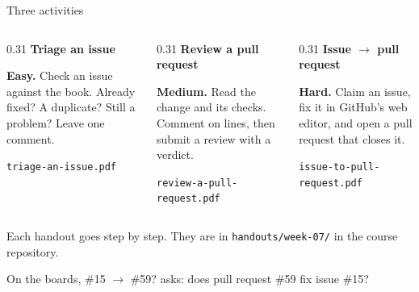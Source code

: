 \documentclass[9pt,aspectratio=169]{beamer}
\begin{document}
\begin{frame}{Three activities}
    \begin{columns}[T]
        \begin{column}{0.31\textwidth}
            \textbf{Triage an issue}\\[2pt]
            {\small \textbf{Easy.} Check an issue against the book. Already fixed? A duplicate? Still a problem? Leave one comment.\par}
            \medskip
            {\footnotesize \texttt{triage-an-issue.pdf}\par}
        \end{column}
        \begin{column}{0.31\textwidth}
            \textbf{Review a pull request}\\[2pt]
            {\small \textbf{Medium.} Read the change and its checks. Comment on lines, then submit a review with a verdict.\par}
            \medskip
            {\footnotesize \texttt{review-a-pull-request.pdf}\par}
        \end{column}
        \begin{column}{0.31\textwidth}
            \textbf{Issue $\to$ pull request}\\[2pt]
            {\small \textbf{Hard.} Claim an issue, fix it in GitHub's web editor, and open a pull request that closes it.\par}
            \medskip
            {\footnotesize \texttt{issue-to-pull-request.pdf}\par}
        \end{column}
    \end{columns}

    \bigskip

    Each handout goes step by step. They are in \texttt{handouts/week-07/} in the course repository.

    \medskip

    {\small On the boards, \#15 $\to$ \#59? asks: does pull request \#59 fix issue \#15?}
\end{frame}
\end{document}
